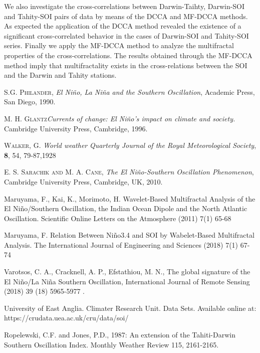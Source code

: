 \documentclass[onecolumn, preprint,aps,amsmath, amssymb, superscriptaddress]{revtex4}
\begin{document}
We also investigate the cross-correlations between Darwin-Taihty, Darwin-SOI and Tahity-SOI pairs of data by means of the DCCA and MF-DCCA methods. As expected the application of the DCCA method revealed the existence of a significant cross-correlated behavior in the cases of Darwin-SOI and Tahity-SOI series. Finally we apply the MF-DCCA method to analyze the multifractal properties of the cross-correlations. The results obtained through the MF-DCCA method imply that multifractality exists in the cross-relations between the SOI and the Darwin and Tahity stations.

 
\begin{thebibliography}{99}
	
 \textsc{S.G. Philander},
\textit{El Ni\~no, La Ni\~na and the Southern Oscillation},
 Academic Press, San Diego, 1990.
 
 \textsc{M. H. Glantz}\textit{Currents of change: El Ni\~no’s impact on climate and society.} Cambridge University Press, Cambridge, 1996.

 \textsc{Walker, G.}
\textit{World weather}
\textit{Quarterly Journal of the Royal Meteorological Society}, \textbf{8}, 54, 79-87,1928

 \textsc{E. S. Sarachik and M. A. Cane},
\textit{The El Ni\~no-Southern Oscillation
Phenomenon}, Cambridge University Press, Cambridge, UK, 2010.

 Maruyama, F., Kai, K., Morimoto, H.  Wavelet-Based Multifractal Analysis of the El Ni\~no/Southern Oscillation, the Indian Ocean Dipole and the North Atlantic Oscillation. Scientific Online Letters on the Atmosphere (2011) 7(1) 65-68

 Maruyama, F. Relation Between Ni\~no3.4 and SOI by Wabelet-Based Multifractal Analysis. The International Journal of Engineering and Sciences  (2018) 7(1) 67-74

 Varotsos, C. A., Cracknell, A. P., Efstathiou, M. N., The
global signature of the El Ni\~no/La Ni\~na Southern Oscillation, International Journal of Remote Sensing (2018) 39 (18) 5965-5977 .

 University of East Anglia. Climater Research Unit. Data Sets. Available online at: https://crudata.uea.ac.uk/cru/data/soi/

 Ropelewski, C.F. and Jones, P.D., 1987: An extension of the Tahiti-Darwin Southern Oscillation Index. Monthly Weather Review 115, 2161-2165. 


\end{thebibliography}
\end{document}
